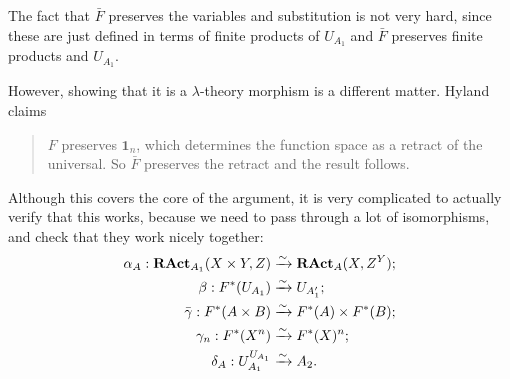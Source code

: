 \begin{remark}
  The fact that $ \bar F $ preserves the variables and substitution is not very hard, since these are just defined in terms of finite products of $ U_{A_1} $ and $ \bar F $ preserves finite products and $ U_{A_1} $.

  However, showing that it is a $ \lambda $-theory morphism is a different matter. Hyland claims
  \begin{quote}
    $ F $ preserves $ \mathbf 1_n $, which determines the function space as a retract of the universal. So $ \bar F $ preserves the retract and the result follows.
  \end{quote}
  Although this covers the core of the argument, it is very complicated to actually verify that this works, because we need to pass through a lot of isomorphisms, and check that they work nicely together:
  \begin{align*}
    \alpha_A: \mathbf{RAct}_{A_1}(X \times Y, Z) &\xrightarrow{\sim} \mathbf{RAct}_{A}(X, Z^Y);\\
    \beta: F^*(U_{A_1}) &\xrightarrow{\sim} U_{A_1^\prime};\\
    \bar \gamma: F^*(A \times B) &\xrightarrow{\sim} F^*(A) \times F^*(B);\\
    \gamma_n: F^*(X^n) &\xrightarrow{\sim} F^*(X)^n;\\
    \delta_A: U_{A_1}^{U_{A_1}} &\xrightarrow{\sim} A_2.
  \end{align*}

\end{remark}
